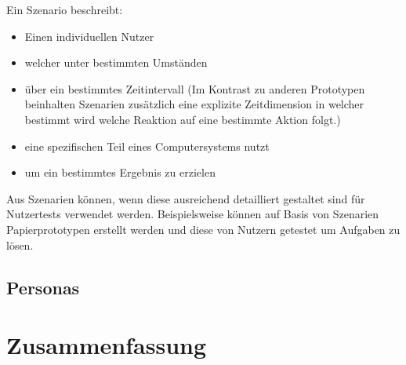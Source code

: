  Ein Szenario beschreibt:

\begin{itemize}
	\item Einen individuellen Nutzer
	\item welcher unter bestimmten Umständen
	\item über ein bestimmtes Zeitintervall (Im Kontrast zu anderen Prototypen beinhalten Szenarien zusätzlich eine explizite Zeitdimension in welcher bestimmt wird welche Reaktion auf eine bestimmte Aktion folgt.)
	\item eine spezifischen Teil eines Computersystems nutzt
	\item um ein bestimmtes Ergebnis zu erzielen
\end{itemize}

 \cite[S.~101]{Nielsen1994} Aus Szenarien können, wenn diese ausreichend detailliert gestaltet sind für Nutzertests verwendet werden. Beispielsweise können auf Basis von Szenarien Papierprototypen erstellt werden 
 und diese von Nutzern getestet um Aufgaben zu lösen. 

\subsection{Personas}

\section{Zusammenfassung}




